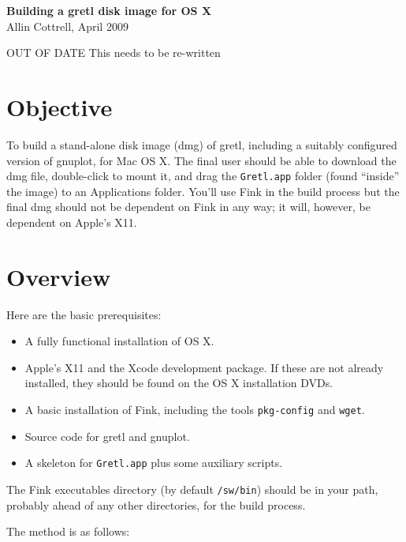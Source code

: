 \documentclass{article}
\begin{document}
\setlength{\parskip}{1ex}
\setlength{\parindent}{0pt}

\begin{center}
  {\Large \textbf{Building a gretl disk image for OS X}}\\[6pt]
Allin Cottrell, April 2009
\end{center}

OUT OF DATE This needs to be re-written

\section{Objective}

To build a stand-alone disk image (dmg) of gretl, including a suitably
configured version of gnuplot, for Mac OS X.  The final user should be
able to download the dmg file, double-click to mount it, and drag the
\texttt{Gretl.app} folder (found ``inside'' the image) to an
Applications folder.  You'll use Fink in the build process but the
final dmg should not be dependent on Fink in any way; it will,
however, be dependent on Apple's X11.

\section{Overview}

Here are the basic prerequisites:

\begin{itemize}
\item A fully functional installation of OS X.
\item Apple's X11 and the Xcode development package.  If these are
  not already installed, they should be found on the OS X installation
  DVDs.
\item A basic installation of Fink, including the tools
  \texttt{pkg-config} and \texttt{wget}.
\item Source code for gretl and gnuplot.
\item A skeleton for \texttt{Gretl.app} plus some auxiliary scripts.
\end{itemize}

The Fink executables directory (by default \texttt{/sw/bin}) should be
in your path, probably ahead of any other directories, for the build
process.

The method is as follows:
\end{document}
